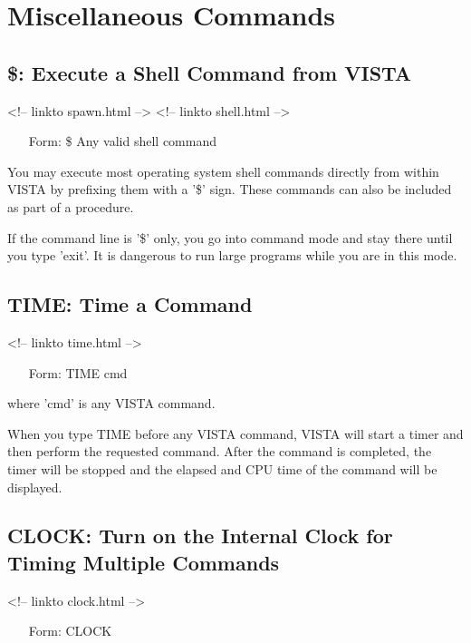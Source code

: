 \chapter{Miscellaneous Commands}

%
%

\section{\$: Execute a Shell Command from VISTA}
\begin{rawhtml}
<!-- linkto spawn.html -->
<!-- linkto shell.html -->
\end{rawhtml}
\begin{itemize}
  \item[Form: \$ Any valid shell command\hfill]{}
\end{itemize}

You may execute most operating system shell commands directly from within
VISTA by prefixing them with a '\$' sign.  These commands can also be
included as part of a procedure.

If the command line is '\$' only, you go into command mode and stay there
until you type 'exit'.  It is dangerous to run large programs while you are
in this mode.

\section{TIME: Time a Command}
\begin{rawhtml}
<!-- linkto time.html -->
\end{rawhtml}
\begin{itemize}
  \item[Form: TIME cmd\hfill]{}
\end{itemize}
where 'cmd' is any VISTA command.

When you type TIME before any VISTA command, VISTA will start a timer and then
perform the requested command.  After the command is completed, the timer will
be stopped and the elapsed and CPU time of the command will be displayed.

\section{CLOCK: Turn on the Internal Clock for Timing Multiple Commands}
\begin{rawhtml}
<!-- linkto clock.html -->
\end{rawhtml}
\begin{itemize}
  \item[Form: CLOCK\hfill]{}
\end{itemize}
 
